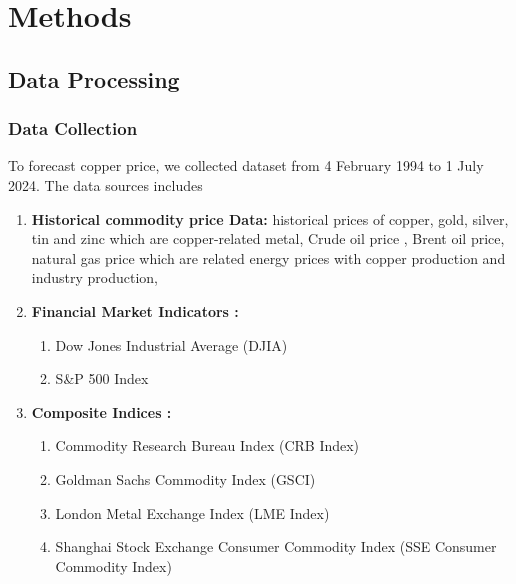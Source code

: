 \documentclass[final-report]{report-template}
\begin{document}
\section{Methods}

\subsection{Data Processing}

\subsubsection{Data Collection}
To forecast copper price, we collected dataset from 4 February 1994 to 1 July 2024. The data sources includes

\begin{enumerate}
    \item \textbf{Historical commodity price Data: } historical prices of copper, gold, silver, tin and zinc which are copper-related metal, Crude oil price , Brent oil price, natural gas price which are related energy prices with copper production and industry production,
    \item \textbf{Financial Market Indicators : }
    \begin{enumerate}
        \item Dow Jones Industrial Average (DJIA)
        \item S\&P 500 Index
    \end{enumerate}
    \item \textbf{Composite Indices :}
    \begin{enumerate}
        \item Commodity Research Bureau Index (CRB Index)
        \item Goldman Sachs Commodity Index (GSCI)
        \item London Metal Exchange Index (LME Index)
        \item Shanghai Stock Exchange Consumer Commodity Index (SSE Consumer Commodity Index)
    \end{enumerate}  
\end{enumerate} 
\end{document}
